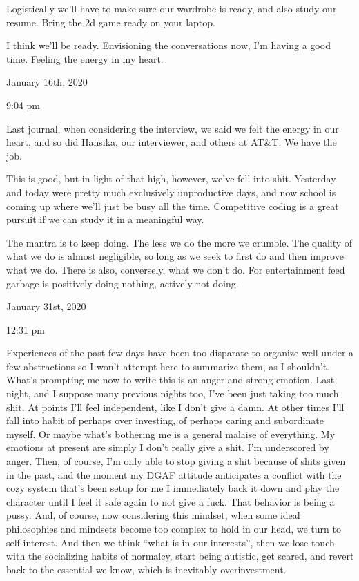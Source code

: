 Logistically we'll have to make sure our wardrobe is ready, and also
study our resume. Bring the 2d game ready on your laptop.

I think we'll be ready. Envisioning the conversations now, I'm having a
good time. Feeling the energy in my heart.

\bigskip
\bigskip
January 16th, 2020

9:04 pm

Last journal, when considering the interview, we said we felt the energy
in our heart, and so did Hansika, our interviewer, and others at AT\&T.
We have the job.

This is good, but in light of that high, however, we've fell into shit.
Yesterday and today were pretty much exclusively unproductive days, and
now school is coming up where we'll just be busy all the time.
Competitive coding is a great pursuit if we can study it in a meaningful
way.

The mantra is to keep doing. The less we do the more we crumble. The
quality of what we do is almost negligible, so long as we seek to first
do and then improve what we do. There is also, conversely, what we don't
do. For entertainment feed garbage is positively doing nothing, actively
not doing.

\bigskip
\bigskip
January 31st, 2020

12:31 pm

Experiences of the past few days have been too disparate to organize
well under a few abstractions so I won't attempt here to summarize them,
as I shouldn't. What's prompting me now to write this is an anger and
strong emotion. Last night, and I suppose many previous nights too, I've
been just taking too much shit. At points I'll feel independent, like I
don't give a damn. At other times I'll fall into habit of perhaps over
investing, of perhaps caring and subordinate myself. Or maybe what's
bothering me is a general malaise of everything. My emotions at present
are simply I don't really give a shit. I'm underscored by anger. Then,
of course, I'm only able to stop giving a shit because of shits given in
the past, and the moment my DGAF attitude anticipates a conflict with
the cozy system that's been setup for me I immediately back it down and
play the character until I feel it safe again to not give a fuck. That
behavior is being a pussy. And, of course, now considering this mindset,
when some ideal philosophies and mindsets become too complex to hold in
our head, we turn to self-interest. And then we think ``what is in our
interests'', then we lose touch with the socializing habits of normalcy,
start being autistic, get scared, and revert back to the essential we
know, which is inevitably overinvestment.

